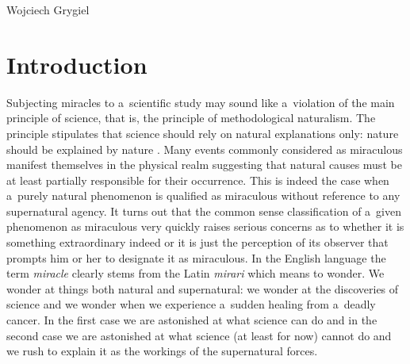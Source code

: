 \begin{artengenv}{Wojciech Grygiel}
\section*{Introduction}
\lettrine[loversize=0.13,lines=2,lraise=-0.01,nindent=0em,findent=0.2pt]%
{S}{}ubjecting miracles to a~scientific study may sound like a~violation of the main principle of science, that is, the principle of methodological naturalism. The principle stipulates that science should rely on natural explanations only: nature should be explained by nature
\parencite[e.g.][]{plantinga_methodological_2001}. %
 Many events commonly considered as miraculous manifest themselves in the physical realm suggesting that natural causes must be at least partially responsible for their occurrence. This is indeed the case when a~purely natural phenomenon is qualified as miraculous without reference to any supernatural agency. It turns out that the common sense classification of a~given phenomenon as miraculous very quickly raises serious concerns as to whether it is something extraordinary indeed or it is just the perception of its observer that prompts him or her to designate it as miraculous. In the English language the term \textit{miracle} clearly stems from the Latin \textit{mirari} which means to wonder. We wonder at things both natural and supernatural: we wonder at the discoveries of science and we wonder when we experience a~sudden healing from a~deadly cancer. In the first case we are astonished at what science can do and in the second case we are astonished at what science (at least for now) cannot do and we rush to explain it as the workings of the supernatural forces.


\end{artengenv}
